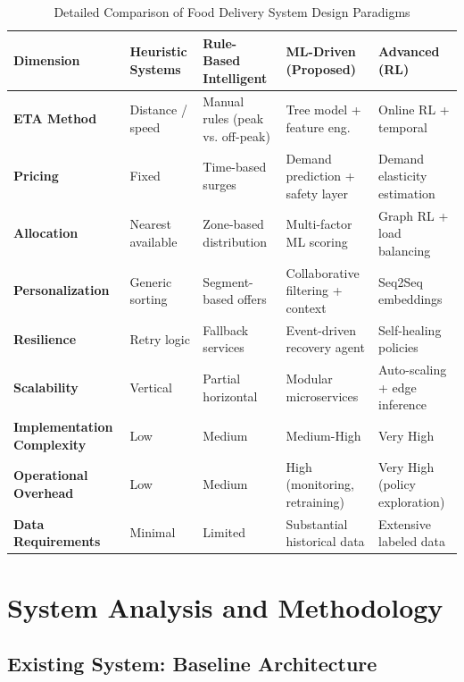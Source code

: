 \documentclass[12pt,a4paper]{report}
\begin{document}
\begin{table}[H]
\centering
\caption{Detailed Comparison of Food Delivery System Design Paradigms}
\begin{tabular}{p{2.2cm} p{2.8cm} p{2.8cm} p{2.8cm} p{2.2cm}}
\toprule
\textbf{Dimension} & \textbf{Heuristic Systems} & \textbf{Rule-Based Intelligent} & \textbf{ML-Driven (Proposed)} & \textbf{Advanced (RL)} \\
\midrule
\textbf{ETA Method} & Distance / speed & Manual rules (peak vs. off-peak) & Tree model + feature eng. & Online RL + temporal \\
\textbf{Pricing} & Fixed & Time-based surges & Demand prediction + safety layer & Demand elasticity estimation \\
\textbf{Allocation} & Nearest available & Zone-based distribution & Multi-factor ML scoring & Graph RL + load balancing \\
\textbf{Personalization} & Generic sorting & Segment-based offers & Collaborative filtering + context & Seq2Seq embeddings \\
\textbf{Resilience} & Retry logic & Fallback services & Event-driven recovery agent & Self-healing policies \\
\textbf{Scalability} & Vertical & Partial horizontal & Modular microservices & Auto-scaling + edge inference \\
\textbf{Implementation Complexity} & Low & Medium & Medium-High & Very High \\
\textbf{Operational Overhead} & Low & Medium & High (monitoring, retraining) & Very High (policy exploration) \\
\textbf{Data Requirements} & Minimal & Limited & Substantial historical data & Extensive labeled data \\
\bottomrule
\end{tabular}
\end{table}

\chapter{System Analysis and Methodology}

\section{Existing System: Baseline Architecture}
\end{document}
